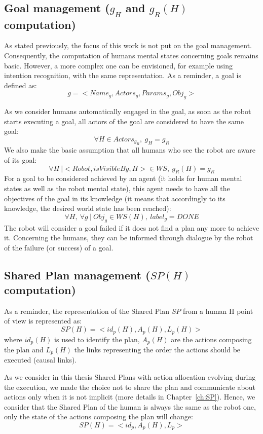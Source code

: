 \documentclass[english,a4paper,11pt,twoside]{StyleThese}
\begin{document}
\subsection{Goal management ($g_H$ and $g_R(H)$ computation)}

As stated previously, the focus of this work is not put on the goal management. Consequently, the computation of humans mental states concerning goals remains basic. However, a more complex one can be envisioned, for example using intention recognition, with the same representation. As a reminder, a goal is defined as:
$$g = <Name_g, Actors_g, Params_g, Obj_g>$$

As we consider humans automatically engaged in the goal, as soon as the robot starts executing a goal, all actors of the goal are considered to have the same goal:
$$ \forall H \in Actors_{g_R}, \ g_H = g_R$$
We also make the basic assumption that all humans who see the robot are aware of its goal:
$$ \forall H  \ | <Robot, isVisibleBy, H> \in WS, \ g_R(H) = g_R$$
For a goal to be considered achieved by an agent (it holds for human mental states as well as the robot mental state), this agent needs to have all the objectives of the goal in its knowledge (it means that accordingly to its knowledge, the desired world state has been reached):
$$ \forall H, \ \forall g  \ | \ Obj_g \in WS(H), \ label_g = DONE$$
The robot will consider a goal failed if it does not find a plan any more to achieve it. Concerning the humans, they can be informed through dialogue by the robot of the failure (or success) of a goal.

\subsection{Shared Plan management ($SP(H)$ computation)}

As a reminder, the representation of the Shared Plan $SP$ from a human H point of view is represented as:
$$SP(H) = <id_p(H), A_p(H), L_p(H)>$$
where $id_p(H)$ is used to identify the plan, $A_p(H)$ are the actions composing the plan and $L_p(H)$ the links representing the order the actions should be executed (causal links).

As we consider in this thesis Shared Plans with action allocation evolving during the execution, we made the choice not to share the plan and communicate about actions only when it is not implicit (more details in Chapter~\ref{ch:SP}). Hence, we consider that the Shared Plan of the human is always the same as the robot one, only the state of the actions composing the plan will change:
$$SP(H) = <id_p, A_p(H), L_p>$$
\end{document}
